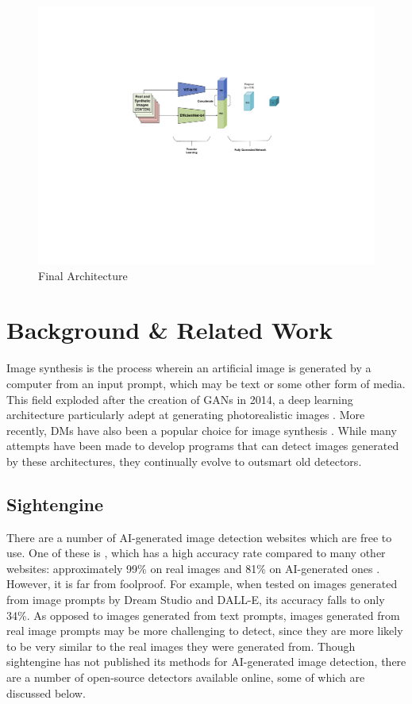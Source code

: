 \documentclass{article} %
\begin{document}
\begin{figure}[h]
    \begin{center}
        \includegraphics[scale=0.45]{figs/EffiVit.pdf}
    \end{center}
    \caption{Final Architecture}
    \label{fig:EffVit Architecture}
\end{figure}

\section{Background \& Related Work}

Image synthesis is the process wherein an artificial image is generated by a computer from an input prompt, which may be text or some other form of media. This field exploded after the creation of GANs in 2014, a deep learning architecture particularly adept at generating photorealistic images \citep{GANfather}. More recently, DMs have also been a popular choice for image synthesis \citep{latent-diffusion}. While many attempts have been made to develop programs that can detect images generated by these architectures, they continually evolve to outsmart old detectors.

\subsection{Sightengine}

There are a number of AI-generated image detection websites which are free to use. One of these is \citet{sightengine}, which has a high accuracy rate compared to many other websites: approximately 99\% on real images and 81\% on AI-generated ones \citep{li2024adversarialaiartunderstandinggeneration}. However, it is far from foolproof. For example, when tested on images generated from image prompts by Dream Studio and DALL-E, its accuracy falls to only 34\%. As opposed to images generated from text prompts, images generated from real image prompts may be more challenging to detect, since they are more likely to be very similar to the real images they were generated from. Though sightengine has not published its methods for AI-generated image detection, there are a number of open-source detectors available online, some of which are discussed below.
\end{document}
